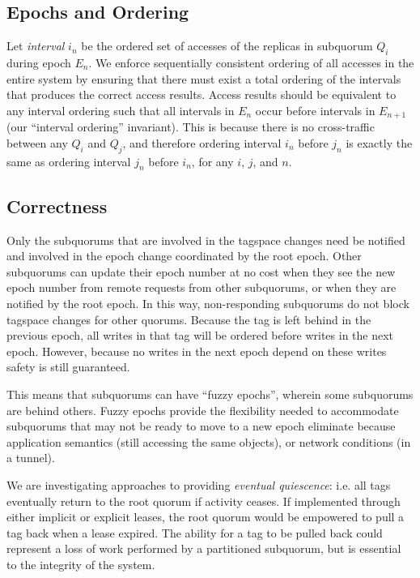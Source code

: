 \documentclass[sigconf]{acmart}
\begin{document}
\subsection{Epochs and Ordering}

Let \emph{interval} $i_n$ be the ordered set of accesses of the replicas in subquorum
$Q_i$ during epoch $E_n$.
We enforce sequentially consistent ordering of all accesses in the entire system by
ensuring that there must exist a total ordering of the intervals that produces the correct
access results.
Access results should be equivalent to any interval ordering
such that all intervals in $E_n$ occur before intervals in $E_{n+1}$ (our ``interval
ordering'' invariant). This is because there is no
cross-traffic between any $Q_i$ and $Q_j$, and therefore ordering interval $i_n$ before $j_n$ is exactly
the same as ordering interval $j_n$ before $i_n$, for any $i$, $j$,
and $n$.

\subsection{Correctness}

Only the subquorums that are involved in the tagspace changes need be notified and
involved in the epoch change coordinated by the root epoch.
Other subquorums can update their epoch number at no cost when they see the new epoch
number from remote requests from other subquorums, or when they are notified by the root
epoch.
In this way, non-responding subquorums do not block tagspace changes for other quorums.
Because the tag is left behind in the previous epoch, all writes in that tag will be
ordered before writes in the next epoch.
However, because no writes in the next epoch depend on these writes safety is still
guaranteed.

This means that subquorums can have ``fuzzy epochs'', wherein some subquorums are behind
others.
Fuzzy epochs provide the flexibility needed to accommodate subquorums that may not be ready
to move to a new epoch eliminate because application semantics (still accessing the same
objects), or network conditions (in a tunnel).

We are investigating approaches to providing \emph{eventual quiescence}: i.e.
all tags eventually return to the root quorum if activity ceases.
If implemented through either implicit or explicit leases,
the root quorum would be empowered to pull a tag back when a lease expired.
The ability for a tag to be pulled back could represent a loss of work performed by a
partitioned subquorum, but is essential to the integrity of the system.
\end{document}
